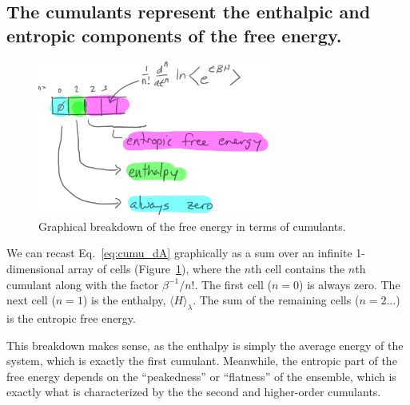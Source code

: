 \documentclass{article}
\begin{document}
\subsection{The cumulants represent the enthalpic and entropic components of the free energy.}

\begin{figure}[tb]
\centering
\includegraphics[width=3in]{figure1.pdf}
\caption{Graphical breakdown of the free energy in terms of cumulants.}
\label{fig:1D}
\end{figure}

We can recast Eq.~\ref{eq:cumu_dA} graphically as a sum over an infinite 1-dimensional array of cells (Figure~\ref{fig:1D}), where the $n$th cell contains the $n$th cumulant along with the factor $\beta^{-1}/n!$. The first cell ($n=0$) is always zero. The next cell ($n=1$) is the enthalpy, $\langle H \rangle_\lambda$. The sum of the remaining cells ($n=2...$) is the entropic free energy.

This breakdown makes sense, as the enthalpy is simply the average energy of the system, which is exactly the first cumulant. Meanwhile, the entropic part of the free energy depends on the ``peakedness'' or ``flatness'' of the ensemble, which is exactly what is characterized by the the second and higher-order cumulants.

\end{document}
